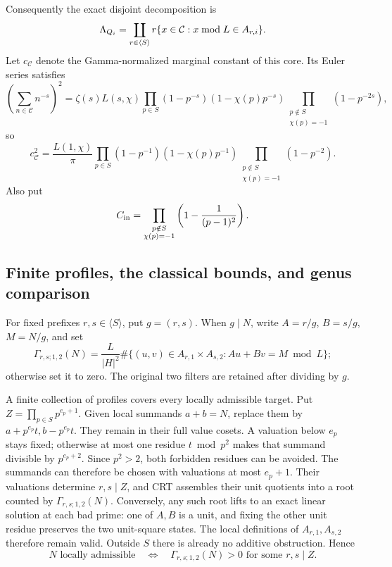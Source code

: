 Consequently the exact disjoint decomposition is
\begin{equation}\label{eq:form-prefix-decomposition}\csname ltx@label\endcsname{eq:norm-prefix-decomposition}
 \Lambda_{Q_i}=\coprod_{r\in\langle S\rangle}
                  r\{x\in\mathcal C:x\bmod L\in A_{r,i}\}.
\end{equation}
Let $c_{\mathcal C}$ denote the Gamma-normalized marginal constant
of this core.  Its Euler series satisfies
\[
 \left(\sum_{n\in\mathcal C}n^{-s}\right)^2
  =\zeta(s)L(s,\chi)
      \prod_{p\in S}(1-p^{-s})(1-\chi(p)p^{-s})
      \prod_{\substack{p\notin S\\\chi(p)=-1}}(1-p^{-2s}),
\]
so
\begin{equation}\label{eq:norm-core-constant}
 c_{\mathcal C}^2=\frac{L(1,\chi)}\pi
       \prod_{p\in S}(1-p^{-1})(1-\chi(p)p^{-1})
       \prod_{\substack{p\notin S\\\chi(p)=-1}}(1-p^{-2}).
\end{equation}
Also put
\[
 C_{\rm in}=\prod_{\substack{p\notin S\\\chi(p)=-1}}
                         \left(1-\frac1{(p-1)^2}\right).
\]

\subsection{Finite profiles, the classical bounds, and genus comparison}

For fixed prefixes \(r,s\in\langle S\rangle\), put \(g=(r,s)\).
When \(g\mid N\), write \(A=r/g\), \(B=s/g\), \(M=N/g\), and set
\[
 \Gamma_{r,s;1,2}(N)=\frac L{|H|^2}
  \#\{(u,v)\in A_{r,1}\times A_{s,2}:Au+Bv=M\bmod L\};
\]
otherwise set it to zero. The original two filters are retained
after dividing by \(g\).

A finite collection of profiles covers every locally admissible
target. Put \(Z=\prod_{p\in S}p^{e_p+1}\). Given local summands
\(a+b=N\), replace them by \(a+p^{e_p}t,b-p^{e_p}t\).
They remain in their full value cosets. A valuation below \(e_p\)
stays fixed; otherwise at most one residue \(t\bmod p^2\) makes that
summand divisible by \(p^{e_p+2}\). Since \(p^2>2\), both forbidden
residues can be avoided. The summands can therefore be chosen with
valuations at most \(e_p+1\). Their valuations determine \(r,s\mid Z\),
and CRT assembles their unit quotients into a root counted by
\(\Gamma_{r,s;1,2}(N)\). Conversely, any such root lifts to an exact
linear solution at each bad prime: one of \(A,B\) is a unit, and
fixing the other unit residue preserves the two unit-square states.
The local definitions of \(A_{r,1},A_{s,2}\) therefore remain valid.
Outside \(S\) there is already no additive obstruction. Hence
\[
 N\text{ locally admissible}\quad\Longleftrightarrow\quad
 \Gamma_{r,s;1,2}(N)>0\text{ for some }r,s\mid Z.
\]

